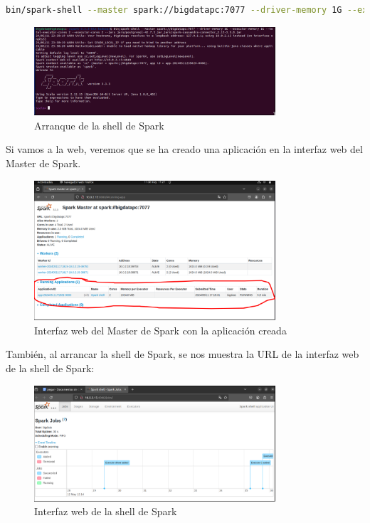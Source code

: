 \begin{lstlisting}[language=bash]
bin/spark-shell --master spark://bigdatapc:7077 --driver-memory 1G --executor-memory 1G --total-executor-cores 2 --executor-cores 2 --jars jars/postgresql-42.7.3.jar,jars/spark-cassandra-connector_2.12-3.3.0.jar
\end{lstlisting}

\begin{figure}[H]
    \centering
    \includegraphics[width=0.8\textwidth]{figures/23.png}
    \caption{Arranque de la shell de Spark}
\end{figure}

Si vamos a la web, veremos que se ha creado una aplicación en la interfaz web del Master de Spark.

\begin{figure}[H]
    \centering
    \includegraphics[width=0.8\textwidth]{figures/24.png}
    \caption{Interfaz web del Master de Spark con la aplicación creada}
\end{figure}

También, al arrancar la shell de Spark, se nos muestra la URL de la interfaz web de la shell de Spark:

\begin{figure}[H]
    \centering
    \includegraphics[width=0.8\textwidth]{figures/58.png}
    \caption{Interfaz web de la shell de Spark}
\end{figure}
